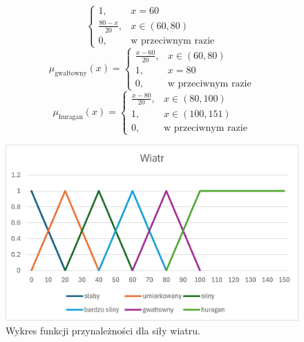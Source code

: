 \documentclass{article}
\begin{document}
\begin{enumerate}
\begin{equation}
\begin{cases}
                    1, & x = 60 \\
                    \frac{80 - x}{20}, & x \in (60, 80) \\
                    0, & \text{w przeciwnym razie}
                    \end{cases}
              \end{equation}
              \begin{equation}
                    \mu_{\text{gwałtowny}}(x) =
                    \begin{cases}
                    \frac{x - 60}{20}, & x \in (60, 80) \\
                    1, & x = 80 \\
                    0, & \text{w przeciwnym razie}
                    \end{cases}
              \end{equation}
                 \begin{equation}
                    \mu_{\text{huragan}}(x) =
                    \begin{cases}
                    \frac{x - 80}{20}, & x \in (80, 100) \\
                    1, & x \in (100, 151) \\
                    0, & \text{w przeciwnym razie}
                    \end{cases}
              \end{equation}
        \begin{figure}[H]
    \centering
    \includegraphics[width=\textwidth]{img/wind.png}
    \caption{Wykres funkcji przynależności dla siły wiatru.}
    \end{figure}
              

\end{enumerate}
\end{document}

